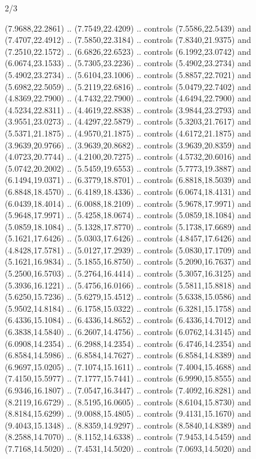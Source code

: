 \begin{flagdescription}{2/3}
\begin{scope}[yshift=\flagwidth,scale=\flagwidth/1241.93737]
\begin{scope}[y=-1mm, x=1mm,draw=gold,fill=blue,line join=miter,miter limit=4,line width=1.8\lw]
{  (7.9688,22.2861) .. (7.7549,22.4209) .. controls (7.5586,22.5439) and
  (7.4707,22.4912) .. (7.5850,22.3184) .. controls (7.8340,21.9375) and
  (7.2510,22.1572) .. (6.6826,22.6523) .. controls (6.1992,23.0742) and
  (6.0674,23.1533) .. (5.7305,23.2236) .. controls (5.4902,23.2734) and
  (5.4902,23.2734) .. (5.6104,23.1006) .. controls (5.8857,22.7021) and
  (5.6982,22.5059) .. (5.2119,22.6816) .. controls (5.0479,22.7402) and
  (4.8369,22.7900) .. (4.7432,22.7900) .. controls (4.6494,22.7900) and
  (4.5234,22.8311) .. (4.4619,22.8838) .. controls (3.9844,23.2793) and
  (3.9551,23.0273) .. (4.4297,22.5879) .. controls (5.3203,21.7617) and
  (5.5371,21.1875) .. (4.9570,21.1875) .. controls (4.6172,21.1875) and
  (3.9639,20.9766) .. (3.9639,20.8682) .. controls (3.9639,20.8359) and
  (4.0723,20.7744) .. (4.2100,20.7275) .. controls (4.5732,20.6016) and
  (5.0742,20.2002) .. (5.5459,19.6553) .. controls (5.7773,19.3887) and
  (6.1494,19.0371) .. (6.3779,18.8701) .. controls (6.8818,18.5039) and
  (6.8848,18.4570) .. (6.4189,18.4336) .. controls (6.0674,18.4131) and
  (6.0439,18.4014) .. (6.0088,18.2109) .. controls (5.9678,17.9971) and
  (5.9648,17.9971) .. (5.4258,18.0674) .. controls (5.0859,18.1084) and
  (5.0859,18.1084) .. (5.1328,17.8770) .. controls (5.1738,17.6689) and
  (5.1621,17.6426) .. (5.0303,17.6426) .. controls (4.8457,17.6426) and
  (4.8428,17.5781) .. (5.0127,17.2939) .. controls (5.0830,17.1709) and
  (5.1621,16.9834) .. (5.1855,16.8750) .. controls (5.2090,16.7637) and
  (5.2500,16.5703) .. (5.2764,16.4414) .. controls (5.3057,16.3125) and
  (5.3936,16.1221) .. (5.4756,16.0166) .. controls (5.5811,15.8818) and
  (5.6250,15.7236) .. (5.6279,15.4512) .. controls (5.6338,15.0586) and
  (5.9502,14.8184) .. (6.1758,15.0322) .. controls (6.3281,15.1758) and
  (6.4336,15.1084) .. (6.4336,14.8652) .. controls (6.4336,14.7012) and
  (6.3838,14.5840) .. (6.2607,14.4756) .. controls (6.0762,14.3145) and
  (6.0908,14.2354) .. (6.2988,14.2354) .. controls (6.4746,14.2354) and
  (6.8584,14.5986) .. (6.8584,14.7627) .. controls (6.8584,14.8389) and
  (6.9697,15.0205) .. (7.1074,15.1611) .. controls (7.4004,15.4688) and
  (7.4150,15.5977) .. (7.1777,15.7441) .. controls (6.9990,15.8555) and
  (6.9346,16.1807) .. (7.0547,16.3447) .. controls (7.4092,16.8281) and
  (8.2119,16.6729) .. (8.5195,16.0605) .. controls (8.6104,15.8730) and
  (8.8184,15.6299) .. (9.0088,15.4805) .. controls (9.4131,15.1670) and
  (9.4043,15.1348) .. (8.8359,14.9297) .. controls (8.5840,14.8389) and
  (8.2588,14.7070) .. (8.1152,14.6338) .. controls (7.9453,14.5459) and
  (7.7168,14.5020) .. (7.4531,14.5020) .. controls (7.0693,14.5020) and
}
\end{scope}
\end{scope}
\end{flagdescription}
